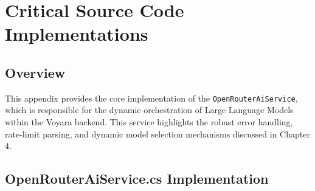 \chapter{Critical Source Code Implementations}

\section{Overview}
This appendix provides the core implementation of the \texttt{OpenRouterAiService}, which is responsible for the dynamic orchestration of Large Language Models within the Voyara backend. This service highlights the robust error handling, rate-limit parsing, and dynamic model selection mechanisms discussed in Chapter 4.

\section{OpenRouterAiService.cs Implementation}

